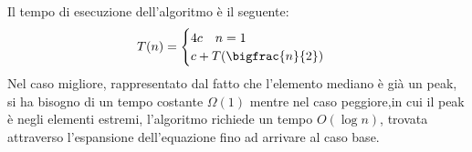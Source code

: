 Il tempo di esecuzione dell'algoritmo è il seguente:
\begin{equation*}
  T(n) = \begin{cases} 4c \quad n = 1\\
                       c + T(\bigfrac{n}{2})\\
         \end{cases}
\end{equation*}
Nel caso migliore, rappresentato dal fatto che l'elemento mediano è già un peak,
si ha bisogno di un tempo costante $\Omega(1)$ mentre nel caso peggiore,in cui il
peak è negli elementi estremi, l'algoritmo richiede un tempo $O(\log n)$,
trovata attraverso l'espansione dell'equazione fino ad arrivare al caso base.
